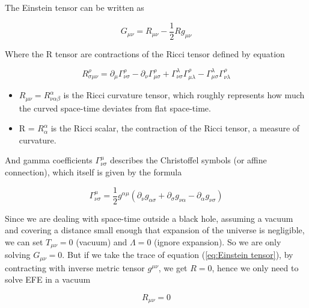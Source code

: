 The Einstein tensor can be written as

\begin{equation}
    G_{\mu \nu } = R_{\mu \nu} - \frac{1}{2} R g_{\mu \nu}
\label{eq:Einstein tensor}
\end{equation}

Where the R tensor are contractions of the Ricci tensor defined by equation 

\begin{equation}
    R_{\sigma \mu \nu }^{\rho }=\partial_{\mu} \Gamma _{\nu \sigma }^{\rho }-\partial_\nu \Gamma _{\mu \sigma }^{\rho }+\Gamma _{\nu \sigma }^{\lambda } \Gamma _{\mu \lambda }^{\rho }-\Gamma _{\mu \sigma }^{\lambda } \Gamma _{\nu \lambda }^{\rho }
\label{eq:Riemann tesnor}
\end{equation}


\begin{itemize}
    \item $R_{\mu \nu} = R^{\alpha}_{\nu \alpha \beta}$ is the Ricci curvature tensor, which roughly represents how much the curved space-time deviates from flat space-time.
    \item R = $R^{\alpha}_{\alpha}$ is the Ricci scalar, the contraction of the Ricci tensor, a measure of curvature.
\end{itemize}

And gamma coefficients $\Gamma^{\mu}_{\nu \sigma}$ describes the Christoffel symbols (or affine connection), which itself is given by the formula

\begin{equation}
    \Gamma^{\mu}_{\nu \sigma} = \frac{1}{2} g^{\alpha \mu} (\partial_{\nu}g_{\alpha \sigma}+\partial_{\sigma} g_{\nu \alpha} - \partial_{\alpha} g_{\nu \sigma})
\label{eq:Christoffel symbol}
\end{equation}

Since we are dealing with space-time outside a black hole, assuming a vacuum and covering a distance small enough that expansion of the universe is negligible, we can set $T_{\mu \nu}=0$ (vacuum) and $\Lambda=0$ (ignore expansion). So we are only solving $G_{\mu \nu}=0$. But if we take the trace of equation (\ref{eq:Einstein tensor}), by contracting with inverse metric tensor $g^{\mu \nu}$, we get $R=0$, hence we only need to solve EFE in a vacuum

\begin{equation}
    R_{\mu \nu } = 0
\label{eq:EFE in a vacuum}
\end{equation}

